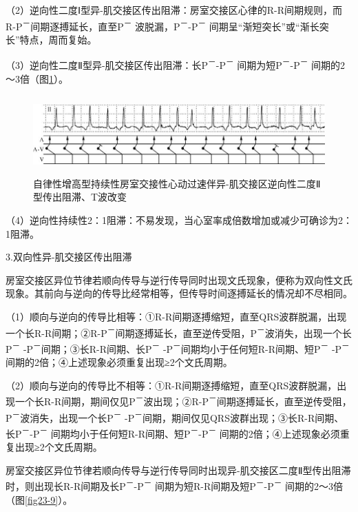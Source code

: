 （2）逆向性二度Ⅰ型异-肌交接区传出阻滞：房室交接区心律的R-R间期规则，而R-P\textsuperscript{－}间期逐搏延长，直至P\textsuperscript{－} 波脱漏，P\textsuperscript{－}-P\textsuperscript{－} 间期呈“渐短突长”或“渐长突长”特点，周而复始。

（3）逆向性二度Ⅱ型异-肌交接区传出阻滞：长P\textsuperscript{－}-P\textsuperscript{－} 间期为短P\textsuperscript{－}-P\textsuperscript{－} 间期的2～3倍（图\ref{fig23-8}）。

\begin{figure}[!htbp]
 \centering
 \includegraphics[width=5.78125in,height=1.1875in]{./images/Image00392.jpg}
 \captionsetup{justification=centering}
 \caption{自律性增高型持续性房室交接性心动过速伴异-肌交接区逆向性二度Ⅱ型传出阻滞、T波改变}
 \label{fig23-8}
  \end{figure} 

（4）逆向性持续性2：1阻滞：不易发现，当心室率成倍数增加或减少可确诊为2：1阻滞。

3.双向性异-肌交接区传出阻滞

房室交接区异位节律若顺向传导与逆行传导同时出现文氏现象，便称为双向性文氏现象。其前向与逆向的传导比经常相等，但传导时间逐搏延长的情况却不尽相同。

（1）顺向与逆向的传导比相等：①R-R间期逐搏缩短，直至QRS波群脱漏，出现一个长R-R间期；②R-P\textsuperscript{－}间期逐搏延长，直至逆传受阻，P\textsuperscript{－}波消失，出现一个长P\textsuperscript{－} -P\textsuperscript{－}间期；③长R-R间期、长P\textsuperscript{－} -P\textsuperscript{－}间期均小于任何短R-R间期、短P\textsuperscript{－} -P\textsuperscript{－}间期的2倍；④上述现象必须重复出现≥2个文氏周期。

（2）顺向与逆向的传导比不相等：①R-R间期逐搏缩短，直至QRS波群脱漏，出现一个长R-R间期，期间仅见P\textsuperscript{－}波出现；②R-P\textsuperscript{－}间期逐搏延长，直至逆传受阻，P\textsuperscript{－}波消失，出现一个长P\textsuperscript{－} -P\textsuperscript{－}间期，期间仅见QRS波群出现；③长R-R间期、长P\textsuperscript{－}-P\textsuperscript{－} 间期均小于任何短R-R间期、短P\textsuperscript{－}-P\textsuperscript{－} 间期的2倍；④上述现象必须重复出现≥2个文氏周期。

房室交接区异位节律若顺向传导与逆行传导同时出现异-肌交接区二度Ⅱ型传出阻滞时，则出现长R-R间期及长P\textsuperscript{－}-P\textsuperscript{－} 间期为短R-R间期及短P\textsuperscript{－}-P\textsuperscript{－} 间期的2～3倍（图\ref{fig23-9}）。

